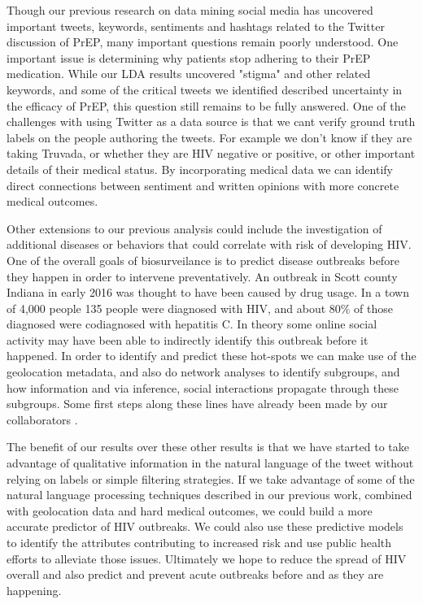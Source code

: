 Though our previous research on data mining social media has uncovered important tweets, keywords, sentiments and hashtags related to the Twitter discussion of PrEP, many important questions remain poorly understood. One important issue is determining why patients stop adhering to their PrEP medication. While our LDA results uncovered "stigma" and other related keywords, and some of the critical tweets we identified described uncertainty in the efficacy of PrEP, this question still remains to be fully answered. One of the challenges with using Twitter as a data source is that we cant verify ground truth labels on the people authoring the tweets. For example we don't know if they are taking Truvada, or whether they are HIV negative or positive, or other important details of their medical status. By incorporating medical data we can identify direct connections between sentiment and written opinions with more concrete medical outcomes.

Other extensions to our previous analysis could include the investigation of additional diseases or behaviors that could correlate with risk of developing HIV. One of the overall goals of biosurveilance is to predict disease outbreaks before they happen in order to intervene preventatively. An outbreak in Scott county Indiana in early 2016 was thought to have been caused by drug usage. In a town of 4,000 people 135 people were diagnosed with HIV, and about 80\% of those diagnosed were codiagnosed with hepatitis C. In theory some online social activity may have been able to indirectly identify this outbreak before it happened\cite{conrad2015community}. In order to identify and predict these hot-spots we can make use of the geolocation metadata, and also do network analyses to identify subgroups, and how information and via inference, social interactions propagate through these subgroups. Some first steps along these lines have already been made by our collaborators \cite{young2014methods}.

The benefit of our results over these other results is that we have started to take advantage of qualitative information in the natural language of the tweet without relying on labels or simple filtering strategies. If we take advantage of some of the natural language processing techniques described in our previous work, combined with geolocation data and hard medical outcomes, we could build a more accurate predictor of HIV outbreaks. We could also use these predictive models to identify the attributes contributing to increased risk and use public health efforts to alleviate those issues. Ultimately we hope to reduce the spread of HIV overall and also predict and prevent acute outbreaks before and as they are happening.

